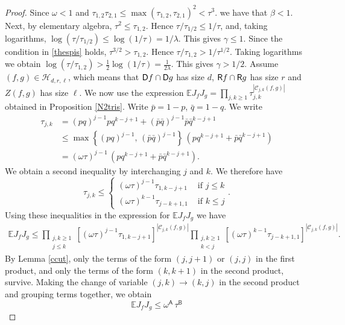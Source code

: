 \documentclass[reqno]{amsart}
\theoremstyle{theorem}
\theoremstyle{definition}
\theoremstyle{remark}
\def\E{\mathbb{E}}
\def\CC{\mathscr{C}}
\def\HH{\mathscr{H}}
\newcommand{\1}{{\text{\Large $\mathfrak 1$}}}	%
\numberwithin{equation}{section}
\def\ran{{\sf R}}
\def\dom{{\sf D}}
\begin{document}
\begin{proof}
Since $\omega<1$ and
$\tau_{1,2} \tau_{2,1} \le \max(\tau_{1,2}, \tau_{2,1})^2 < \tau^3$. 
we have that $\beta<1$.
Next, by elementary algebra, $\tau^2 \le \tau_{1,2}$. Hence $\tau/\tau_{1/2}  \le 1/\tau$,
and, taking logarithms, $\log(\tau/\tau_{1/2}) \le \log(1/\tau)=1/\lambda$.
This gives $\gamma \le 1$.
Since the condition in \eqref{thespis} holds, $\tau^{3/2} >\tau_{1,2}$. 
Hence $\tau/\tau_{1,2} >1/\tau^{1/2}$.
Taking logarithms we obtain $\log(\tau/\tau_{1,2}) > \frac12 \log(1/\tau)
=\frac{1}{2\lambda}$.
This gives $\gamma >1/2$.
Assume $(f,g) \in \HH_{d,r,\ell}$, which means that
$\dom f \cap \dom g$ has size $d$, $\ran f \cap \ran g$ has size $r$ 
and $Z(f,g)$ has size $\ell$.
We now use the expression 
$\E J_f J_g=\prod_{j,k \ge 1} \tau_{j,k}^{|\CC_{j,k}(f,g)|}$ obtained in
Proposition \ref{N2tris}.
Write $\bar p = 1-p$, $\bar q = 1-q$.
We write 
\begin{align*}
\tau_{j,k} 
&= (pq)^{j-1} p q^{k-j+1} 
+ (\bar p \bar q)^{j-1}  \bar p  \bar q^{k-j+1} 
\\
&\le \max\left\{(pq)^{j-1},\, (\bar p\bar q)^{j-1}\right\}
\, (p q^{k-j+1} + \bar p \bar q^{k-j+1}) 
\\
& = (\omega \tau)^{j-1} \, (p q^{k-j+1} + \bar p \bar q^{k-j+1}).
\end{align*}
We obtain a second inequality by interchanging $j$ and $k$.
We therefore have
\[
\tau_{j,k} \le \begin{cases}
(\omega \tau)^{j-1} \tau_{1,k-j+1} & \text{ if } j \le k
\\
(\omega \tau)^{k-1} \tau_{j-k+1,1} & \text{ if } k \le j
\end{cases}.
\]
Using these inequalities in the expression for $\E J_f J_g$ we have
\begin{align*}
\E J_f J_g \le
\prod_{\substack{j,k \ge 1\\ j \le k}} 
\left[(\omega \tau)^{j-1} \tau_{1,k-j+1}\right]^{|\CC_{j,k}(f,g)|}
\prod_{\substack{j,k \ge 1\\ k<j}} 
\left[(\omega \tau)^{k-1} \tau_{j-k+1,1}\right]^{|\CC_{j,k}(f,g)|}.
\end{align*}
By Lemma \ref{ccut}, only the terms of the form $(j,j+1)$ or $(j,j)$ 
in the first product, and only the terms of the form $(k,k+1)$ in the second product,
survive. Making the change of variable $(j,k) \to (k,j)$ in the second
product and grouping terms together, we obtain
\begin{equation}
\label{once}
\E J_f J_g \le
\omega^{\mathsf A} \, \tau^{\mathsf B}

\end{equation}
\end{proof}
\end{document}
